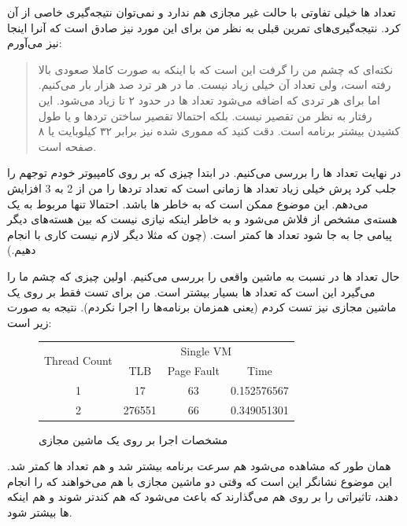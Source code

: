 تعداد
ها
خیلی تفاوتی با حالت غیر مجازی هم ندارد و نمی‌توان نتیجه‌گیری خاصی از آن کرد. نتیجه‌گیری‌های تمرین قبلی
به نظر من برای این مورد نیز صادق است که آنرا اینجا نیز می‌آورم:
\begin{quote}
    نکته‌ای که چشم من را گرفت این است که
    با اینکه به صورت کاملا صعودی بالا رفته است،‌ ولی تعداد آن خیلی زیاد نیست. ما در هر ترد صد هزار بار
    می‌کنیم. اما برای هر تردی که اضافه می‌شود تعداد 
    ها
    در حدود ۲ تا زیاد می‌شود. این رفتار به نظر من تقصیر
    نیست. بلکه احتمالا تقصیر ساختن ترد‌ها و یا طول کشیدن بیشتر برنامه است. دقت کنید که مموری
    شده نیز برابر
    ۳۲ کیلوبایت یا
    ۸ صفحه است.
\end{quote}

در نهایت تعداد
ها
را بررسی می‌کنیم. در ابتدا چیزی که بر روی کامپیوتر خودم توجهم را جلب کرد پرش خیلی زیاد تعداد
ها
زمانی است که تعداد ترد‌ها را من از 2 به 3 افزایش می‌دهم. این موضوع ممکن است که به خاطر
ها
باشد. احتمالا تنها
مربوط به یک هسته‌ی مشخص از
فلاش می‌شود و به خاطر اینکه نیازی نیست که بین هسته‌های دیگر پیامی جا به جا شود تعداد
ها
کمتر است. (چون که مثلا دیگر لازم نیست کاری با  انجام دهیم.)

حال تعداد
ها
در
نسبت به ماشین واقعی را بررسی می‌کنیم. اولین چیزی که چشم ما را می‌گیرد این است که تعداد
ها
بسیار بیشتر است. من برای تست فقط بر روی یک ماشین مجازی نیز تست کردم (یعنی همزمان برنامه‌ها را اجرا نکردم).
نتیجه به صورت زیر است:
\begin{figure}[H]
    \small
    \centering
    \begin{latin}
    \begin{tabular}{|c|ccc|}
        \hline
        \multirow{2}{*}{Thread Count} & \multicolumn{3}{|c|}{Single VM}\\
        & TLB & Page Fault & Time\\
        \hline
        1 & 17&63&0.152576567\\
        2 & 276551&66&0.349051301\\
        \hline
    \end{tabular}
    \end{latin}
    \caption{مشخصات اجرا بر روی یک ماشین مجازی}
\end{figure}
همان طور که مشاهده می‌شود هم سرعت برنامه بیشتر شد و هم تعداد
ها
کمتر شد. این موضوع نشانگر این است که وقتی دو ماشین مجازی با هم می‌خواهند که
را انجام دهند،‌ تاثیراتی را بر روی هم می‌گذارند که باعث می‌شود که هم کندتر شوند و هم اینکه
ها
بیشتر شود.

